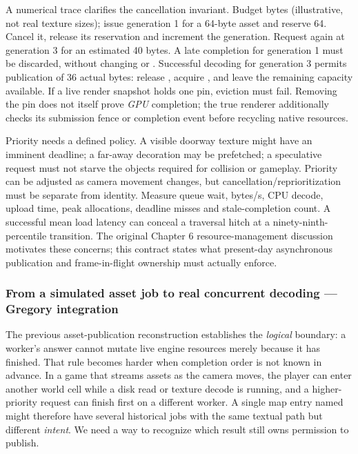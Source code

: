 A numerical trace clarifies the cancellation invariant. Budget  bytes (illustrative, not real texture sizes); issue generation 1 for a 64-byte asset and reserve 64. Cancel it, release its reservation and increment the generation. Request again at generation 3 for an estimated 40 bytes. A late completion for generation 1 must be discarded, without changing  or . Successful decoding for generation 3 permits publication of 36 actual bytes: release , acquire , and leave the remaining capacity available. If a live render snapshot holds one pin, eviction must fail. Removing the pin does not itself prove \emph{GPU} completion; the true renderer additionally checks its submission fence or completion event before recycling native resources.

Priority needs a defined policy. A visible doorway texture might have an imminent deadline; a far-away decoration may be prefetched; a speculative request must not starve the objects required for collision or gameplay. Priority can be adjusted as camera movement changes, but cancellation/reprioritization must be separate from identity. Measure queue wait, bytes/s, CPU decode, upload time, peak allocations, deadline misses and stale-completion count. A successful mean load latency can conceal a traversal hitch at a ninety-ninth-percentile transition. The original Chapter 6 resource-management discussion motivates these concerns; this contract states what present-day asynchronous publication and frame-in-flight ownership must actually enforce.

\subsubsection{From a simulated asset job to real concurrent decoding --- Gregory integration}\label{06-engine-ii-ch027-from-a-simulated-asset-job-to-real-concurrent-decoding-gregory-integration}

\hypertarget{06-engine-ii-ch027-from-a-simulated-asset-job-to-real-concurrent-decoding-gregory-integration}{}

The previous asset-publication reconstruction establishes the \emph{logical} boundary: a worker's answer cannot mutate live engine resources merely because it has finished. That rule becomes harder when completion order is not known in advance. In a game that streams assets as the camera moves, the player can enter another world cell while a disk read or texture decode is running, and a higher-priority request can finish first on a different worker. A single map entry named  might therefore have several historical jobs with the same textual path but different \emph{intent}. We need a way to recognize which result still owns permission to publish.

